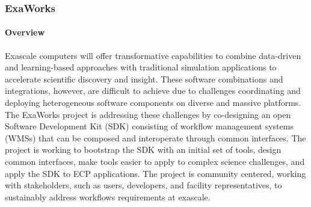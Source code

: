 
\subsubsection{ ExaWorks} \label{subsubsect:exaworks}


\paragraph{Overview} 
Exascale computers will offer transformative capabilities to combine
data-driven and learning-based approaches with traditional simulation
applications to accelerate scientific discovery and insight. These software
combinations and integrations, however, are difficult to achieve due to
challenges coordinating and deploying heterogeneous software components
on diverse and massive platforms. The ExaWorks project is addressing 
these challenges by co-designing an open Software Development Kit (SDK) 
consisting of workflow management systems (WMSs) that can be
composed and interoperate through common interfaces. 
The project is working to bootstrap the SDK with an initial
set of tools, design common interfaces, make tools
easier to apply to complex science challenges, 
and apply the SDK to ECP applications.
The project is community centered, 
working with stakeholders, such as
users, developers, and facility representatives, to 
sustainably address workflows requirements at
exascale.




